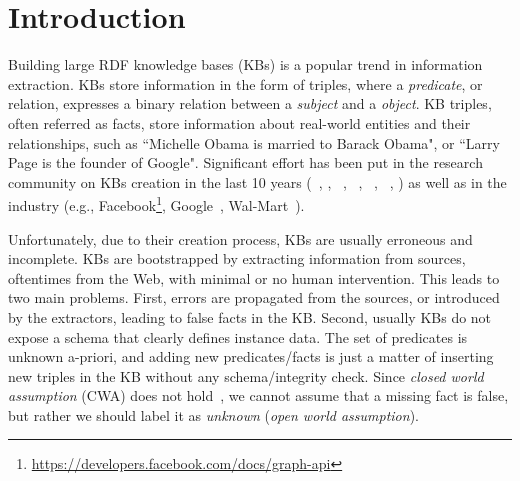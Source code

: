 \section{Introduction}

Building large RDF knowledge bases (KBs) is a popular trend in information extraction.
KBs store information in the form of triples, where a \emph{predicate}, or relation, expresses a binary relation between a \emph{subject} and a \emph{object}. KB triples, often referred as facts, store information about real-world entities and their relationships, such as %
 ``Michelle Obama is married to Barack Obama", or ``Larry Page is the founder of Google".
Significant effort has been put in the research community on KBs creation in the last 10 years (~\cite{bizer2009dbpedia}, \cite{bollacker2008freebase}, ~\cite{vrandevcic2014wikidata}, \deepdive~\cite{shin2015incremental}, ~\cite{suchanek2008yago}, ~\cite{carlson2010toward}, \cite{banko2007open}) as well as in the industry %
(e.g., Facebook\footnote{\url{https://developers.facebook.com/docs/graph-api}}, Google~\cite{dong2014knowledge}, Wal-Mart~\cite{deshpande2013building}).

Unfortunately, due to their creation process, KBs are usually erroneous and incomplete.
KBs are bootstrapped by extracting information from sources, oftentimes from the Web, with minimal or no human intervention.  This leads to two main problems. First, errors are propagated from the sources, or introduced by the extractors, leading to false facts in the KB. Second, usually KBs do not expose a schema that clearly defines instance data. The set of predicates is unknown a-priori, and adding new predicates/facts is just a matter of inserting new triples in the KB without any schema/integrity check.  
Since \emph{closed world assumption} (CWA) does not hold~\cite{dong2014knowledge,galarraga2015fast}, we cannot assume that a missing fact is false, but rather we should label it as \emph{unknown} (\emph{open world assumption}).



